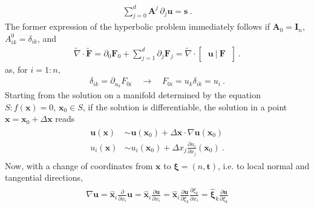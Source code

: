 \documentclass[letterpaper,10pt,english]{jupyterBook}
\begin{document}
\begin{equation*}
\begin{split}\sum_{j=0}^{d} \mathbf{A}^j \, \partial_j \mathbf{u} = \mathbf{s} \ .\end{split}
\end{equation*}
\sphinxAtStartPar
The former expression of the hyperbolic problem immediately follows if \(\mathbf{A}_0 = \mathbf{I}_n\), \(A^0_{ik} = \delta_{ik}\), and
\begin{equation*}
\begin{split}\widetilde{\nabla} \cdot \widetilde{\mathbf{F}} = \partial_0 \mathbf{F}_0 + \sum_{j=1}^{d} \partial_j \mathbf{F}_j = \widetilde{\nabla} \cdot \begin{bmatrix} \ \mathbf{u} \ | \ \mathbf{F} \ \end{bmatrix} \ .\end{split}
\end{equation*}
\sphinxAtStartPar
as, for \(i = 1:n\),
\begin{equation*}
\begin{split}\delta_{ik} = \partial_{u_k} F_{0i} \quad \rightarrow \quad F_{0i} = u_k \delta_{ik} = u_i \ .\end{split}
\end{equation*}
\sphinxAtStartPar
{} Starting from the solution on a manifold determined by the equation \(S: f(\mathbf{x}) = 0\), \(\mathbf{x}_0 \in S\), if the solution is differentiable, the solution in a point \(\mathbf{x} = \mathbf{x}_0 + \Delta \mathbf{x}\) reads
\begin{equation*}
\begin{split}\begin{aligned}
  \mathbf{u}(\mathbf{x}) & \sim \mathbf{u}(\mathbf{x}_0) + \Delta \mathbf{x} \cdot \nabla \mathbf{u}(\mathbf{x}_0) \\
  u_i(\mathbf{x}) & \sim u_i(\mathbf{x}_0) + \Delta x_j \frac{\partial u_i}{\partial x_j}(\mathbf{x}_0) \ .
\end{aligned}\end{split}
\end{equation*}
\sphinxAtStartPar
Now, with a change of coordinates from \(\mathbf{x}\) to \(\boldsymbol\xi = (n, \mathbf{t})\), i.e. to local normal and tangential directions,
\begin{equation*}
\begin{split}\begin{aligned}
  \nabla \mathbf{u} 
  = \hat{\mathbf{x}}_i \frac{\partial}{\partial x_i} \mathbf{u} 
  = \hat{\mathbf{x}}_i \frac{\partial \mathbf{u}}{\partial x_i} 
  = \hat{\mathbf{x}}_i \frac{\partial \mathbf{u}}{\partial \xi_k} \frac{\partial \xi_k}{\partial x_i} 
  = \hat{\boldsymbol\xi}_k \frac{\partial \mathbf{u}}{\partial \xi_k}
\end{aligned}\end{split}
\end{equation*}
\end{document}
